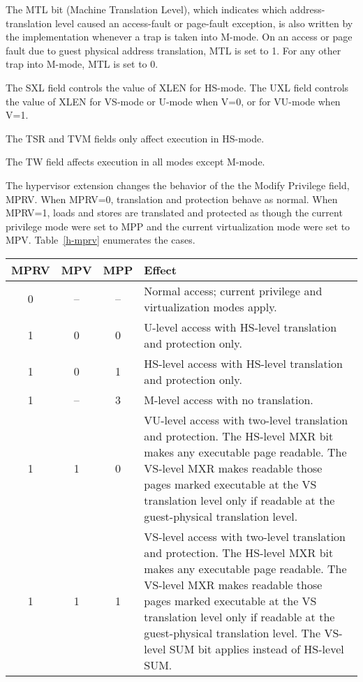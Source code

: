 The MTL bit (Machine Translation Level), which indicates which address-translation level
caused an access-fault or page-fault exception, is also written by the implementation whenever a trap
is taken into M-mode.
On an access or page fault due to guest physical address translation, MTL is
set to 1.
For any other trap into M-mode, MTL is set to 0.

The SXL field controls the value of XLEN for HS-mode.
The UXL field controls the value of XLEN for VS-mode or U-mode when V=0, or for
VU-mode when V=1.

The TSR and TVM fields only affect execution in HS-mode.

The TW field affects execution in all modes except M-mode.

The hypervisor extension changes the behavior of the the Modify Privilege
field, MPRV.  When MPRV=0, translation and protection behave as normal.  When
MPRV=1, loads and stores are translated and protected as though the current
privilege mode were set to MPP and the current virtualization mode were set to
MPV.  Table~\ref{h-mprv} enumerates the cases.

\begin{table*}[h!]
\begin{center}
\begin{tabular}{|c|c|c||p{4.5in}|}
  \hline
   MPRV & MPV & MPP & Effect \\ \hline \hline
   0    & --  & --  & Normal access; current privilege and virtualization modes apply. \\ \hline
   1    & 0   & 0   & U-level access with HS-level translation and protection only. \\ \hline
   1    & 0   & 1   & HS-level access with HS-level translation and protection only.  \\ \hline
   1    & --  & 3   & M-level access with no translation. \\ \hline
   1    & 1   & 0   & VU-level access with two-level translation and protection. The HS-level MXR bit makes any executable page readable.  The VS-level MXR makes readable those pages marked executable at the VS translation level only if readable at the guest-physical translation level. \\ \hline
   1    & 1   & 1   & VS-level access with two-level translation and protection. The HS-level MXR bit makes any executable page readable.  The VS-level MXR makes readable those pages marked executable at the VS translation level only if readable at the guest-physical translation level.  The VS-level SUM bit applies instead of HS-level SUM. \\ \hline
 \end{tabular}
\end{center}
\caption{Effect on load and store translation and protection under MPRV.  When MPRV=1, MPP$\neq$3, and {\tt hstatus}.SPRV=1, the effective privilege is further modified: {\tt hstatus}.SPV applies instead of MPV, and the HS-level SPP applies instead of MPP.}
\label{h-mprv}
\end{table*}

